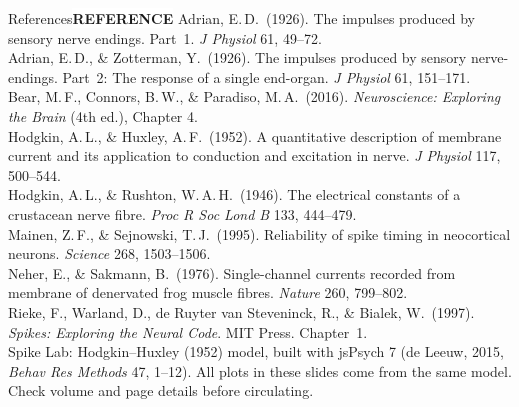 \documentclass[aspectratio=169,11pt]{beamer}
\newcommand{\tagpill}[3]{{\normalfont\footnotesize\setlength{\fboxsep}{2.5pt}\colorbox{#1}{\textcolor{#2}{\bfseries #3}}}}
\newcommand{\tRef}{\tagpill{white}{kgrey}{REFERENCE}}
\begin{document}
\begin{frame}{References}{\tRef}
  \fontsize{7.5}{8.8}\selectfont
  Adrian, E.\,D.\ (1926). The impulses produced by sensory nerve endings. Part~1. \emph{J Physiol} 61, 49--72.\\[2pt]
  Adrian, E.\,D., \& Zotterman, Y.\ (1926). The impulses produced by sensory nerve-endings. Part~2: The response of a single end-organ. \emph{J Physiol} 61, 151--171.\\[2pt]
  Bear, M.\,F., Connors, B.\,W., \& Paradiso, M.\,A.\ (2016). \emph{Neuroscience: Exploring the Brain} (4th ed.), Chapter 4.\\[2pt]
  Hodgkin, A.\,L., \& Huxley, A.\,F.\ (1952). A quantitative description of membrane current and its application to conduction and excitation in nerve. \emph{J Physiol} 117, 500--544.\\[2pt]
  Hodgkin, A.\,L., \& Rushton, W.\,A.\,H.\ (1946). The electrical constants of a crustacean nerve fibre. \emph{Proc R Soc Lond B} 133, 444--479.\\[2pt]
  Mainen, Z.\,F., \& Sejnowski, T.\,J.\ (1995). Reliability of spike timing in neocortical neurons. \emph{Science} 268, 1503--1506.\\[2pt]
  Neher, E., \& Sakmann, B.\ (1976). Single-channel currents recorded from membrane of denervated frog muscle fibres. \emph{Nature} 260, 799--802.\\[2pt]
  Rieke, F., Warland, D., de Ruyter van Steveninck, R., \& Bialek, W.\ (1997). \emph{Spikes: Exploring the Neural Code}. MIT Press. Chapter~1.\\[4pt]
  Spike Lab: Hodgkin--Huxley (1952) model, built with jsPsych 7 (de Leeuw, 2015, \emph{Behav Res Methods} 47, 1--12). All plots in these slides come from the same model.\\[3pt]
  {\color{kred}Check volume and page details before circulating.}
\end{frame}
\end{document}
